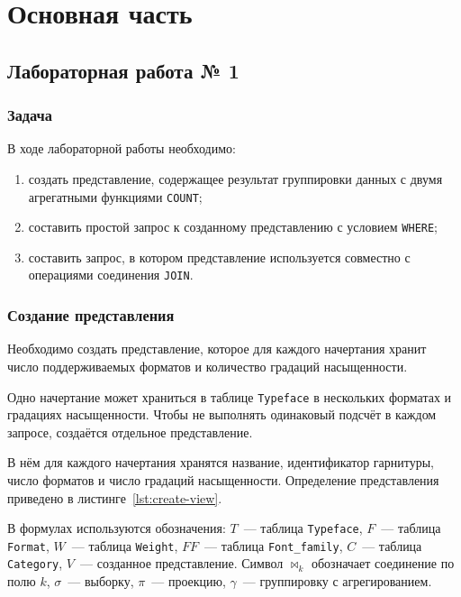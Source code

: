 \section{Основная часть}

\subsection{Лабораторная работа № 1}

\subsubsection{Задача}

В ходе лабораторной работы необходимо:

\begin{enumerate}
    \item создать представление, содержащее результат группировки данных с
    двумя агрегатными функциями \texttt{COUNT};
    \item составить простой запрос к созданному представлению с условием
    \texttt{WHERE};
    \item составить запрос, в котором представление используется совместно с
    операциями соединения \texttt{JOIN}.
\end{enumerate}

\subsubsection{Создание представления}

Необходимо создать представление, которое для каждого начертания хранит число
поддерживаемых форматов и количество градаций насыщенности.

Одно начертание может храниться в таблице \texttt{Typeface} в
нескольких форматах и градациях насыщенности. Чтобы не выполнять одинаковый
подсчёт в каждом запросе, создаётся отдельное представление.

В нём для каждого начертания хранятся название, идентификатор гарнитуры, число
форматов и число градаций насыщенности. Определение представления приведено в
листинге~\ref{lst:create-view}.

В формулах используются обозначения: $T$~--- таблица
\texttt{Typeface}, $F$~--- таблица
\texttt{Format}, $W$~--- таблица
\texttt{Weight}, $FF$~--- таблица
\texttt{Font_family}, $C$~--- таблица
\texttt{Category}, $V$~--- созданное представление. Символ
$\bowtie_{k}$ обозначает соединение по полю $k$, $\sigma$~---
выборку, $\pi$~--- проекцию, $\gamma$~--- группировку с агрегированием.


